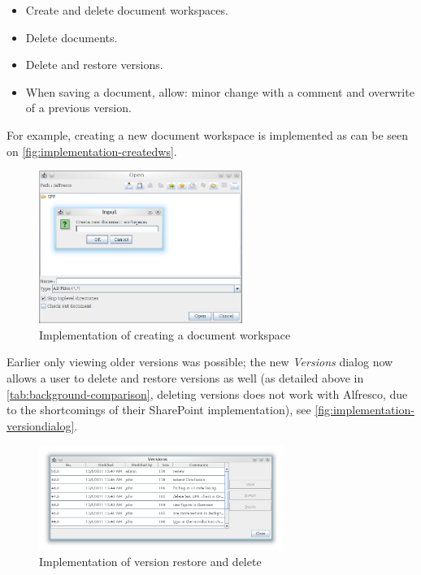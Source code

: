 \begin{itemize}
\item Create and delete document workspaces.
\item Delete documents.
\item Delete and restore versions.
\item When saving a document, allow: minor change with a comment and overwrite of a previous version.
\end{itemize}

For example, creating a new document workspace is implemented as can be seen on
\autoref{fig:implementation-createdws}.

\begin{figure}[H]
\centering
\includegraphics[width=250px,keepaspectratio]{implementation-createdws.png}
\caption{Implementation of creating a document workspace}
\label{fig:implementation-createdws}
\end{figure}

Earlier only viewing older versions was possible; the new \emph{Versions}
dialog now allows a user to delete and restore versions as well (as detailed
above in \autoref{tab:background-comparison}, deleting versions does not work
with Alfresco, due to the shortcomings of their SharePoint implementation), see
\autoref{fig:implementation-versiondialog}.

\begin{figure}[H]
\centering
\includegraphics[width=300px,keepaspectratio]{implementation-versiondialog.png}
\caption{Implementation of version restore and delete}
\label{fig:implementation-versiondialog}
\end{figure}

